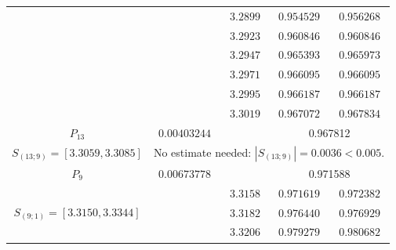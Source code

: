 \documentclass[10pt]{amsart}
\numberwithin{equation}{section}
\theoremstyle{definition}
\newcommand\intpx[2]{S_{(#1;#2)}}
\begin{document}
\begin{longtable}{|c|c|c|c|c|}
  &  &  $3.2899 $  &  $ 0.954529 $ & $ 0.956268 $ \\
  &  &  $3.2923 $  &  $ 0.960846 $ & $ 0.960846 $ \\
  &  &  $3.2947 $  &  $ 0.965393 $ & $ 0.965973 $ \\
  &  &  $3.2971 $  &  $ 0.966095 $ & $ 0.966095 $ \\
  &  &  $3.2995 $  &  $ 0.966187 $ & $ 0.966187 $ \\
  &  &  $3.3019 $  &  $ 0.967072 $ & $ 0.967834 $ \\
 \hline
   $P_{13}$ & $0.00403244 $ &  & \multicolumn{2}{c|}{0.967812} \\
 \hline
 $ \intpx{13}{9} =  [3.3059,3.3085] $ & \multicolumn{4}{c|}{No estimate needed:
  $|\intpx{13}{9}| = 0.0036 < 0.005$. \phantom{\Large $R_{1}^2$} } \\
 \hline
   $P_{9}$ &  $0.00673778 $ &  & \multicolumn{2}{c|}{0.971588} \\
 \hline
   \multirow{8}{*}{ $ \intpx{9}{1} = [3.3150,3.3344] $ } 
   &  &  $3.3158 $  &  $  0.971619 $  &  $  0.972382 $ \\
   &  &  $3.3182 $  &  $  0.976440 $  &  $  0.976929 $ \\
   &  &  $3.3206 $  &  $  0.979279 $  &  $  0.980682 $ \\

\end{longtable}
\end{document}
